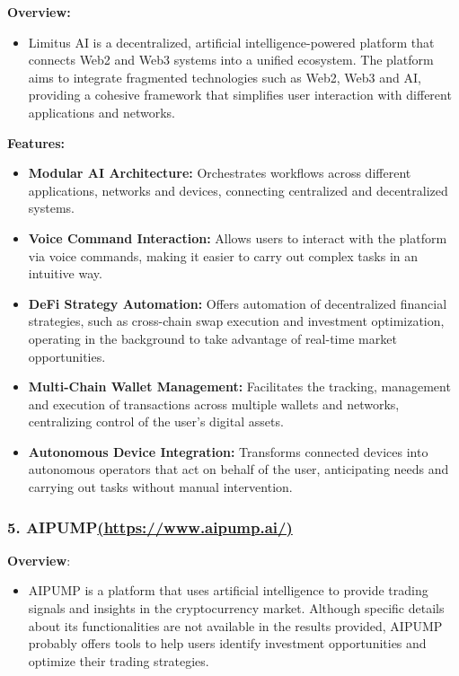\documentclass[
]{article}
\providecommand{\tightlist}{%
  \setlength{\itemsep}{0pt}\setlength{\parskip}{0pt}}
\begin{document}
\textbf{Overview:}

\begin{itemize}
\tightlist
\item
  Limitus AI is a decentralized, artificial intelligence-powered
  platform that connects Web2 and Web3 systems into a unified ecosystem.
  The platform aims to integrate fragmented technologies such as Web2,
  Web3 and AI, providing a cohesive framework that simplifies user
  interaction with different applications and networks.
\end{itemize}

\textbf{Features:}

\begin{itemize}
\tightlist
\item
  \textbf{Modular AI Architecture:} Orchestrates workflows across
  different applications, networks and devices, connecting centralized
  and decentralized systems.
\item
  \textbf{Voice Command Interaction:} Allows users to interact with the
  platform via voice commands, making it easier to carry out complex
  tasks in an intuitive way.
\item
  \textbf{DeFi Strategy Automation:} Offers automation of decentralized
  financial strategies, such as cross-chain swap execution and
  investment optimization, operating in the background to take advantage
  of real-time market opportunities.
\item
  \textbf{Multi-Chain Wallet Management:} Facilitates the tracking,
  management and execution of transactions across multiple wallets and
  networks, centralizing control of the user's digital assets.
\item
  \textbf{Autonomous Device Integration:} Transforms connected devices
  into autonomous operators that act on behalf of the user, anticipating
  needs and carrying out tasks without manual intervention.
\end{itemize}

\hypertarget{aipumphttpswww.aipump.ai}{%
\subsubsection{\texorpdfstring{\textbf{5.
AIPUMP}\href{https://www.aipump.ai/}{(https://www.aipump.ai/)}}{5. AIPUMP(https://www.aipump.ai/)}}\label{aipumphttpswww.aipump.ai}}

\textbf{Overview}:

\begin{itemize}
\tightlist
\item
  AIPUMP is a platform that uses artificial intelligence to provide
  trading signals and insights in the cryptocurrency market. Although
  specific details about its functionalities are not available in the
  results provided, AIPUMP probably offers tools to help users identify
  investment opportunities and optimize their trading strategies.
\end{itemize}
\end{document}
